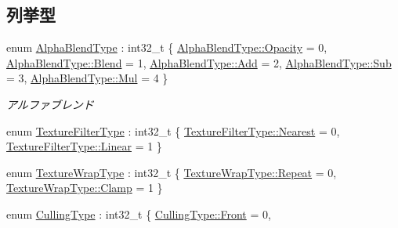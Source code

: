 \subsection*{列挙型}
\begin{DoxyCompactItemize}
\item 
enum \mbox{\hyperlink{namespace_effekseer_a8c32fd5b7ec7feed73314b2ae8086949}{Alpha\+Blend\+Type}} \+: int32\+\_\+t \{ \newline
\mbox{\hyperlink{namespace_effekseer_a8c32fd5b7ec7feed73314b2ae8086949abad6a5dd8c28e6b14f8e986615e3dc98}{Alpha\+Blend\+Type\+::\+Opacity}} = 0, 
\mbox{\hyperlink{namespace_effekseer_a8c32fd5b7ec7feed73314b2ae8086949a09ac609fcdb514c9adca34e7f97b4ac4}{Alpha\+Blend\+Type\+::\+Blend}} = 1, 
\mbox{\hyperlink{namespace_effekseer_a8c32fd5b7ec7feed73314b2ae8086949aec211f7c20af43e742bf2570c3cb84f9}{Alpha\+Blend\+Type\+::\+Add}} = 2, 
\mbox{\hyperlink{namespace_effekseer_a8c32fd5b7ec7feed73314b2ae8086949ae80155eceb940c89e2de63ad05868db2}{Alpha\+Blend\+Type\+::\+Sub}} = 3, 
\newline
\mbox{\hyperlink{namespace_effekseer_a8c32fd5b7ec7feed73314b2ae8086949a62b6d55816cf737bfc6f42e60df1a3f2}{Alpha\+Blend\+Type\+::\+Mul}} = 4
 \}
\begin{DoxyCompactList}\small\item\em アルファブレンド \end{DoxyCompactList}\item 
enum \mbox{\hyperlink{namespace_effekseer_ae3518502cfcb4ec4991f13c0b3e4c6ee}{Texture\+Filter\+Type}} \+: int32\+\_\+t \{ \mbox{\hyperlink{namespace_effekseer_ae3518502cfcb4ec4991f13c0b3e4c6eea60494f02d440f316319dd0fad40ad007}{Texture\+Filter\+Type\+::\+Nearest}} = 0, 
\mbox{\hyperlink{namespace_effekseer_ae3518502cfcb4ec4991f13c0b3e4c6eea32a843da6ea40ab3b17a3421ccdf671b}{Texture\+Filter\+Type\+::\+Linear}} = 1
 \}
\item 
enum \mbox{\hyperlink{namespace_effekseer_a5320c83784602974b6278bf1a77b58a3}{Texture\+Wrap\+Type}} \+: int32\+\_\+t \{ \mbox{\hyperlink{namespace_effekseer_a5320c83784602974b6278bf1a77b58a3a7020426cfb0a204051be4b3053d2acc8}{Texture\+Wrap\+Type\+::\+Repeat}} = 0, 
\mbox{\hyperlink{namespace_effekseer_a5320c83784602974b6278bf1a77b58a3a08825280e3f8137556325061ba67ff8c}{Texture\+Wrap\+Type\+::\+Clamp}} = 1
 \}
\item 
enum \mbox{\hyperlink{namespace_effekseer_a3ae9542a9c9309ec191be1ae5e6dc00a}{Culling\+Type}} \+: int32\+\_\+t \{ \mbox{\hyperlink{namespace_effekseer_a3ae9542a9c9309ec191be1ae5e6dc00aa5835bab1ade0060909e31a06af2e2cde}{Culling\+Type\+::\+Front}} = 0, 

\end{DoxyCompactItemize}
